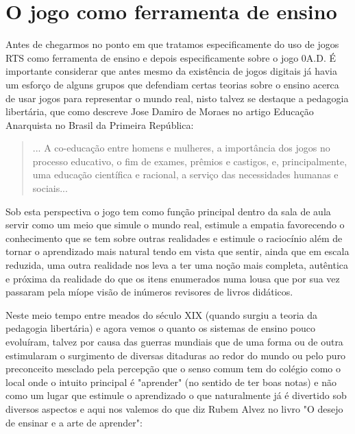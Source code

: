 \documentclass[article,11pt, a4paper,sumario=tradicional]{abntex2}
\begin{document}
\section{O jogo como ferramenta de ensino}
    Antes de chegarmos no ponto em que tratamos especificamente do uso de jogos RTS como ferramenta de ensino e depois especificamente sobre o jogo 0A.D. É importante considerar que antes mesmo da existência de jogos digitais já havia um esforço  de alguns grupos que defendiam certas teorias sobre o ensino acerca de usar jogos para representar o mundo real, nisto talvez se destaque a pedagogia libertária, que como descreve Jose Damiro de Moraes no artigo Educação Anarquista no Brasil da Primeira República: 
    \begin{quote}
    	... A co-educação entre homens e mulheres, a importância dos jogos no processo educativo, o fim de exames, prêmios e castigos, e, principalmente, uma	educação científica e racional, a serviço das necessidades humanas e sociais...
    \end{quote}
    
    Sob esta perspectiva o jogo tem como função principal dentro da sala de aula servir como um meio que simule o mundo real, estimule a empatia favorecendo o conhecimento que se tem sobre outras realidades  e estimule o raciocínio além de tornar o aprendizado mais natural tendo em vista que sentir, ainda que em escala reduzida, uma outra realidade nos leva a ter uma noção mais completa, autêntica e próxima da realidade do que os itens enumerados numa lousa que por sua vez passaram pela míope visão de inúmeros revisores de livros didáticos.

    Neste meio tempo entre meados do século XIX (quando surgiu a teoria da pedagogia libertária) e agora vemos o quanto os sistemas de ensino pouco evoluíram, talvez por causa das guerras mundiais que de uma forma ou de outra estimularam o surgimento de diversas ditaduras ao redor do mundo ou pelo puro preconceito mesclado pela percepção que o senso comum tem do colégio como o local onde o intuito principal é "aprender" (no sentido de ter boas notas) e não como um lugar que estimule o aprendizado o que naturalmente já é divertido sob diversos aspectos e aqui nos valemos do que diz Rubem Alvez no livro "O desejo de ensinar e a arte de aprender":
\end{document}
